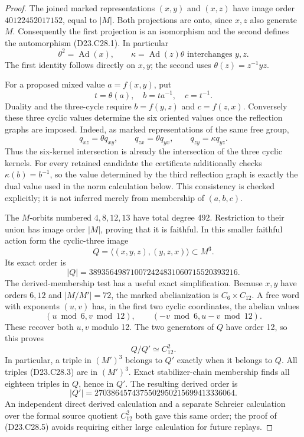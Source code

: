 \begin{proof}
The joined marked representations $(x,y)$ and $(x,z)$ have
image order $40122452017152$, equal to $|M|$.
Both projections are onto, since $x,z$ also generate $M$.
Consequently the first projection is an isomorphism and
the second defines the automorphism (D23.C28.1).  In particular
\[
             \theta^2=\operatorname{Ad}(x),\qquad
             \kappa=\operatorname{Ad}(z)\theta
                  \text{ interchanges }y,z.               \tag{D23.C28.2}
\]
The first identity follows directly on $x,y$; the second
uses $\theta(z)=z^{-1}yz$.

For a proposed mixed value $a=f(x,y)$, put
\[
                  t=\theta(a),\quad b=ta^{-1},\quad c=t^{-1}.
                                                               \tag{D23.C28.3}
\]
Duality and the three-cycle require $b=f(y,z)$ and
$c=f(z,x)$.  Conversely these three cyclic values determine
the six oriented values once the reflection graphs are
imposed.  Indeed, as marked representations of the same
free group,
\[
 q_{xz}=\theta q_{xy},\qquad
 q_{zx}=\theta q_{yx},\qquad
 q_{zy}=\kappa q_{yz}.                                    \tag{D23.C28.4}
\]
Thus the six-kernel intersection is already the intersection
of the three cyclic kernels.  For every retained candidate
the certificate additionally checks
$\kappa(b)=b^{-1}$, so the value determined by the third
reflection graph is exactly the dual value used in the norm
calculation below.  This consistency is checked explicitly;
it is not inferred merely from membership of $(a,b,c)$.

The $M$-orbits numbered $4,8,12,13$ have total degree 492.
Restriction to their union has image order $|M|$, proving
that it is faithful.  In this smaller faithful action form
the cyclic-three image
\[
 Q=\big\langle (x,y,z),(y,z,x)\big\rangle
                      \subset M^3.
\]
Its exact order is
\[
                 |Q|=389356498710072424831060715520393216.
\]
The derived-membership test has a useful exact simplification.
Because $x,y$ have orders $6,12$ and $|M/M'|=72$, the marked
abelianization is $C_6\times C_{12}$.  A free word with
exponents $(u,v)$ has, in the first two cyclic coordinates,
the abelian values
\[
       (u\bmod6,v\bmod12),\qquad
       (-v\bmod6,u-v\bmod12).
\]
These recover both $u,v$ modulo 12.  The two generators of
$Q$ have order 12, so this proves
\[
                 Q/Q'\simeq C_{12}^2.                    \tag{D23.C28.5}
\]
In particular, a triple in $(M')^3$ belongs to $Q'$ exactly
when it belongs to $Q$.  All triples (D23.C28.3) are in
$(M')^3$.  Exact stabilizer-chain membership finds all
eighteen triples in $Q$, hence in $Q'$.  The resulting
derived order is
\[
                |Q'|=2703864574375502950215699413336064.
\]
An independent direct derived calculation and a separate
Schreier calculation over the formal source quotient
$C_{12}^2$ both gave this same order; the proof of
(D23.C28.5) avoids requiring either large calculation for
future replays.


\end{proof}
